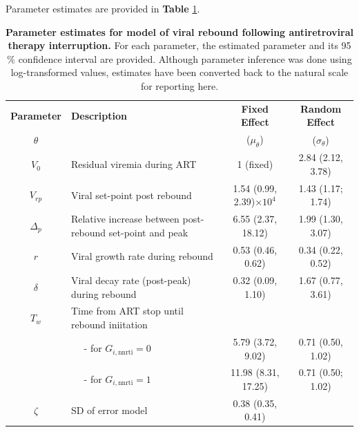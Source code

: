 \documentclass{article}[11pt]
\begin{document}
Parameter estimates are provided in \textbf{Table} \ref{table:estimates_viralrebound}. 

\begin{table}[!ht]
\centering
\caption{\textbf{Parameter estimates for model of viral rebound following antiretroviral therapy interruption.} For each parameter, the estimated parameter and its 95$\%$ confidence interval are provided. Although parameter inference was done using log-transformed values, estimates have been converted back to the natural scale for reporting here.}
\begin{tabular}{cp{}cc}
\toprule
\textbf{Parameter} & \textbf{Description} &  \textbf{Fixed Effect} & \textbf{Random Effect} \\
$\theta$  &  &  ($\mu_{\theta}$) & ($\sigma_{\theta}$) \\
\midrule
$V_0$ & Residual viremia during ART & 1 (fixed) &  2.84 (2.12, 3.78) \\
$V_{rp}$ & Viral set-point post rebound&  1.54 (0.99, 2.39)$\times10^4$ &  1.43 (1.17; 1.74) \\
$\Delta_p$ & Relative increase between post-rebound set-point and peak & 6.55 (2.37, 18.12) & 1.99 (1.30, 3.07) \\
$r$ & Viral growth rate during rebound & 0.53 (0.46, 0.62) & 0.34 (0.22, 0.52) \\
$\delta$ & Viral decay rate (post-peak) during rebound & 0.32 (0.09, 1.10) & 1.67 (0.77, 3.61) \\
$T_w$ & Time from ART stop until rebound iniitation &  & \\
      & $\quad$ - for $G_{i,\text{nnrti}}=0$  & 5.79 (3.72, 9.02) & 0.71 (0.50, 1.02)  \\
      & $\quad$ - for $G_{i,\text{nnrti}}=1$  & 11.98 (8.31, 17.25) & 0.71 (0.50; 1.02) \\
$\zeta$ & SD of error model & 0.38 (0.35, 0.41) & \\
\bottomrule
\end{tabular}
\label{table:estimates_viralrebound}
 \end{table}
\end{document}
